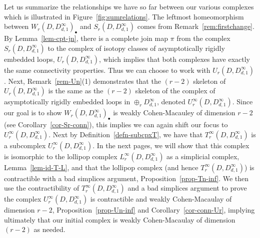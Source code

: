 \documentclass[11pt, a4paper]{amsart}
\theoremstyle{definition}
\begin{document}
Let us summarize the relationships we have so far between our various complexes which is illustrated in Figure~\ref{fig:sumrelations}. The leftmost homeomorphism between $W_r(D,D^{\infty}_{d,1})_\bullet$ and $S_r(D,D^{\infty}_{d,1})$ comes from Remark~\ref{rem:firstchange}. By Lemma~\ref{lem-cpt-jn}, there is a complete join map $\pi$ from the complex $S_r(D,D^{\infty}_{d,1})$ to the complex of isotopy classes of asymptotically rigidly embedded loops, $U_r(D,D^{\infty}_{d,1})$, which implies that both complexes have exactly the same connectivity properties. Thus we can choose to work with $U_r(D,D^{\infty}_{d,1})$. Next, Remark~\ref{rem-Un}(1) demonstrates that the $(r-2)$ skeleton of $U_r(D,D^{\infty}_{d,1})$ is the same as the $(r-2)$ skeleton of the complex of asymptotically rigidly embedded loops in $\oplus_r D^{\infty}_{d,1}$, denoted $U_r^{\infty}(D,D^{\infty}_{d,1})$. Since our goal is to show $W_r(D,D^{\infty}_{d,1})_\bullet$ is weakly Cohen-Macauley of dimension $r-2$ (see Corollary~\ref{cor-Sr-conn}), this implies we can again shift our focus to $U_r^{\infty}(D,D^{\infty}_{d,1})$. Next by Definition~\ref{defn-subcpxT}, we have that $T_r^\infty(D,D^{\infty}_{d,1})$ is a subcomplex $U_r^{\infty}(D,D^{\infty}_{d,1})$.  In the next pages, we will show that this complex is isomorphic to the lollipop complex $L_r^\infty(D,D^{\infty}_{d,1})$ as a simplicial complex, Lemma~\ref{lem-id-T-L}, and that the lollipop complex (and hence $T_r^\infty(D,D^{\infty}_{d,1})$) is contractible with a bad simplices argument, Proposition~\ref{prop-Tn-inf}. We then use the contractibility of $T_r^\infty(D,D^{\infty}_{d,1})$ and a bad simplices argument to prove the complex $U_r^{\infty}(D,D^{\infty}_{d,1})$ is contractible and weakly Cohen-Macaulay of dimension $r-2$, Proposition~\ref{prop-Un-inf} and Corollary~\ref{cor-conn-Ur}, implying ultimately that our initial complex is weakly Cohen-Macaulay of dimension $(r-2)$ as needed.












\end{document}
